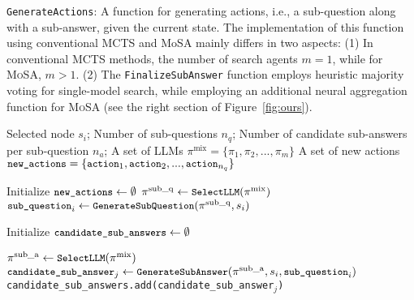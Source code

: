 \begin{algorithm*}[tb]
\begin{small}
   \caption{
   \small
   \texttt{GenerateActions}: A function for generating actions, i.e., a sub-question along with a sub-answer, given the current state.
    The implementation of this function using conventional MCTS and MoSA mainly differs in two aspects: 
   (1) In conventional MCTS methods, the number of search agents \(m=1\), while for \textsc{MoSA}, \(m > 1\). 
   (2) The \texttt{FinalizeSubAnswer} function employs heuristic majority voting for single-model search, while employing an additional neural aggregation function for \textsc{MoSA} (see the right section of Figure~\ref{fig:ours}).
   }
   
   \label{alg:mosa-A_1}
\begin{algorithmic}
    \REQUIRE Selected node \(s_i\); Number of sub-questions \(n_q\); Number of candidate sub-answers per sub-question \(n_a\); A set of LLMs \(\pi^{\mathrm{mix}} = \{ \pi_1, \pi_2, ..., \pi_m \}\)
    \ENSURE A set of new actions \(\texttt{\small new\_actions} = \{ \texttt{\small action}_1, \texttt{\small action}_2, ..., \texttt{\small action}_{n_q} \}\)
    
    \STATE Initialize \(\texttt{\small new\_actions} \leftarrow \emptyset\) 
        \STATE \(\pi^{\mathrm{sub\_q}} \leftarrow \texttt{\small SelectLLM}(\pi^{\mathrm{mix}})\) 
        \STATE \(\texttt{\small sub\_question}_i \leftarrow \texttt{\small GenerateSubQuestion}(\pi^{\mathrm{sub\_q}}, s_i)\) 
        
        \STATE Initialize \(\texttt{\small candidate\_sub\_answers} \leftarrow \emptyset\) 

            \STATE \(\pi^{\mathrm{sub\_a}} \leftarrow \texttt{\small SelectLLM}(\pi^{\mathrm{mix}})\) 
            \STATE \(\texttt{\small candidate\_sub\_answer}_j \leftarrow \texttt{\small GenerateSubAnswer}(\pi^{\mathrm{sub\_a}}, s_i, \texttt{\small sub\_question}_i)\) 
            \STATE \texttt{\small candidate\_sub\_answers.add(candidate\_sub\_answer$_j$)} 
        \ENDFOR
        

\end{algorithmic}
\end{small}
\end{algorithm*}
